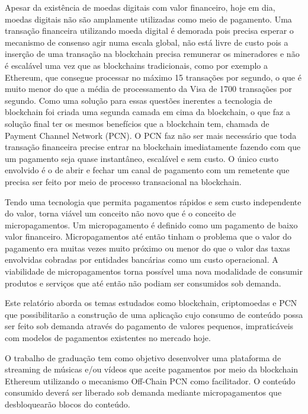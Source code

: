 \documentclass[12pt]{article}
\begin{document}
Apesar da existência de moedas digitais com valor financeiro, hoje em dia, moedas digitais não são amplamente utilizadas como meio de pagamento. Uma transação financeira utilizando moeda digital é demorada pois precisa esperar o mecanismo de consenso agir numa escala global, não está livre de custo pois a inserção de uma transação na blockchain precisa remunerar os mineradores e não é escalável uma vez que as blockchains tradicionais, como por exemplo a Ethereum, que consegue processar no máximo 15 transações por segundo, o que é muito menor do que a média de processamento da Visa de 1700 transações por segundo\cite{mercan2021cryptocurrency, visa2019speed, ethereum2021oficial}. Como uma solução para essas questões inerentes a tecnologia de blockchain foi criada uma segunda camada em cima da blockchain, o que faz a solução final ter os mesmos benefícios que a blockchain tem, chamada de Payment Channel Network (PCN)\cite{mercan2021cryptocurrency}. O PCN faz não ser mais necessário que toda transação financeira precise entrar na blockchain imediatamente fazendo com que um pagamento seja quase instantâneo, escalável e sem custo. O único custo envolvido é o de abrir e fechar um canal de pagamento com um remetente que precisa ser feito por meio de processo transacional na blockchain\cite{raidenmedium}.

Tendo uma tecnologia que permita pagamentos rápidos e sem custo independente do valor, torna viável um conceito não novo que é o conceito de micropagamentos. Um micropagamento é definido como um pagamento de baixo valor financeiro. Micropagamentos até então tinham o problema que o valor do pagamento era muitas vezes muito próximo ou menor do que o valor das taxas envolvidas cobradas por entidades bancárias como um custo operacional. A viabilidade de micropagamentos torna possível uma nova modalidade de consumir produtos e serviços que até então não podiam ser consumidos sob demanda.

Este relatório aborda os temas estudados como blockchain, criptomoedas e PCN que possibilitarão a construção de uma aplicação cujo consumo de conteúdo possa ser feito sob demanda através do pagamento de valores pequenos, impraticáveis com modelos de pagamentos existentes no mercado hoje.

O trabalho de graduação tem como objetivo desenvolver uma plataforma de streaming de músicas e/ou vídeos que aceite pagamentos por meio da blockchain Ethereum utilizando o mecanismo Off-Chain PCN como facilitador. O conteúdo consumido deverá ser liberado sob demanda mediante micropagamentos que desbloquearão blocos do conteúdo.
\end{document}
